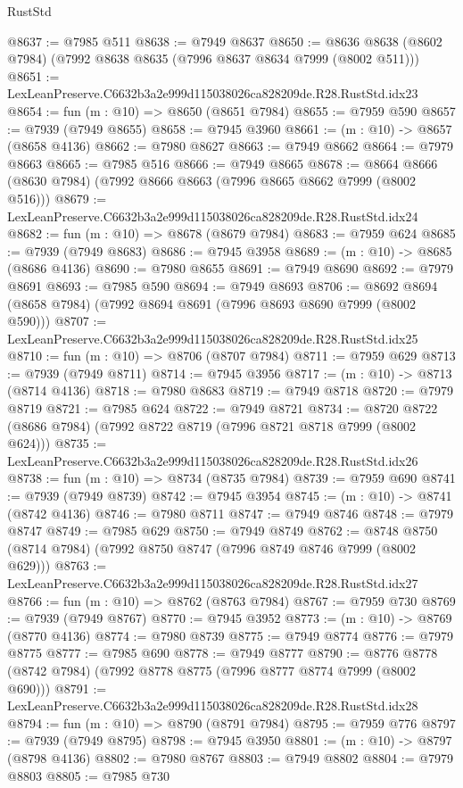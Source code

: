 \begin{lexlean}{RustStd}
\begin{coremodule}
@8637 := @7985 @511
@8638 := @7949 @8637
@8650 := @8636 @8638 (@8602 @7984) (@7992 @8638 @8635 (@7996 @8637 @8634 @7999 (@8002 @511)))
@8651 := LexLeanPreserve.C6632b3a2e999d115038026ca828209de.R28.RustStd.idx23
@8654 := fun (m : @10) => @8650 (@8651 @7984)
@8655 := @7959 @590
@8657 := @7939 (@7949 @8655)
@8658 := @7945 @3960
@8661 := (m : @10) -> @8657 (@8658 @4136)
@8662 := @7980 @8627
@8663 := @7949 @8662
@8664 := @7979 @8663
@8665 := @7985 @516
@8666 := @7949 @8665
@8678 := @8664 @8666 (@8630 @7984) (@7992 @8666 @8663 (@7996 @8665 @8662 @7999 (@8002 @516)))
@8679 := LexLeanPreserve.C6632b3a2e999d115038026ca828209de.R28.RustStd.idx24
@8682 := fun (m : @10) => @8678 (@8679 @7984)
@8683 := @7959 @624
@8685 := @7939 (@7949 @8683)
@8686 := @7945 @3958
@8689 := (m : @10) -> @8685 (@8686 @4136)
@8690 := @7980 @8655
@8691 := @7949 @8690
@8692 := @7979 @8691
@8693 := @7985 @590
@8694 := @7949 @8693
@8706 := @8692 @8694 (@8658 @7984) (@7992 @8694 @8691 (@7996 @8693 @8690 @7999 (@8002 @590)))
@8707 := LexLeanPreserve.C6632b3a2e999d115038026ca828209de.R28.RustStd.idx25
@8710 := fun (m : @10) => @8706 (@8707 @7984)
@8711 := @7959 @629
@8713 := @7939 (@7949 @8711)
@8714 := @7945 @3956
@8717 := (m : @10) -> @8713 (@8714 @4136)
@8718 := @7980 @8683
@8719 := @7949 @8718
@8720 := @7979 @8719
@8721 := @7985 @624
@8722 := @7949 @8721
@8734 := @8720 @8722 (@8686 @7984) (@7992 @8722 @8719 (@7996 @8721 @8718 @7999 (@8002 @624)))
@8735 := LexLeanPreserve.C6632b3a2e999d115038026ca828209de.R28.RustStd.idx26
@8738 := fun (m : @10) => @8734 (@8735 @7984)
@8739 := @7959 @690
@8741 := @7939 (@7949 @8739)
@8742 := @7945 @3954
@8745 := (m : @10) -> @8741 (@8742 @4136)
@8746 := @7980 @8711
@8747 := @7949 @8746
@8748 := @7979 @8747
@8749 := @7985 @629
@8750 := @7949 @8749
@8762 := @8748 @8750 (@8714 @7984) (@7992 @8750 @8747 (@7996 @8749 @8746 @7999 (@8002 @629)))
@8763 := LexLeanPreserve.C6632b3a2e999d115038026ca828209de.R28.RustStd.idx27
@8766 := fun (m : @10) => @8762 (@8763 @7984)
@8767 := @7959 @730
@8769 := @7939 (@7949 @8767)
@8770 := @7945 @3952
@8773 := (m : @10) -> @8769 (@8770 @4136)
@8774 := @7980 @8739
@8775 := @7949 @8774
@8776 := @7979 @8775
@8777 := @7985 @690
@8778 := @7949 @8777
@8790 := @8776 @8778 (@8742 @7984) (@7992 @8778 @8775 (@7996 @8777 @8774 @7999 (@8002 @690)))
@8791 := LexLeanPreserve.C6632b3a2e999d115038026ca828209de.R28.RustStd.idx28
@8794 := fun (m : @10) => @8790 (@8791 @7984)
@8795 := @7959 @776
@8797 := @7939 (@7949 @8795)
@8798 := @7945 @3950
@8801 := (m : @10) -> @8797 (@8798 @4136)
@8802 := @7980 @8767
@8803 := @7949 @8802
@8804 := @7979 @8803
@8805 := @7985 @730

\end{coremodule}
\end{lexlean}
